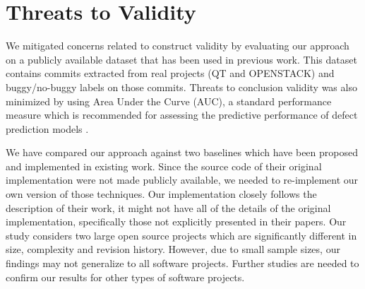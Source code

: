 \section{Threats to Validity}
\label{sec:threat}
We mitigated concerns related to construct validity  by evaluating our approach on a publicly available dataset that has been used in previous work. This dataset contains commits extracted from real projects (QT and OPENSTACK) and buggy/no-buggy labels on those commits. Threats to conclusion validity was also minimized by using Area Under the Curve (AUC), a standard performance measure which is recommended for assessing the predictive performance of defect prediction models \cite{tantithamthavorn2018optimization}. 

We have compared our approach against two baselines which have been proposed and implemented in existing work. Since the source code of their original implementation were not made publicly available, we needed to re-implement our own version of those techniques. Our implementation closely follows the description of their work, it might not have all of the details of the original implementation, specifically those not explicitly presented in their papers. Our study considers two large open source projects which are significantly different in size, complexity and revision history. However, due to small sample sizes, our findings may not generalize to all software projects. Further studies are needed to confirm our results for other types of software projects.